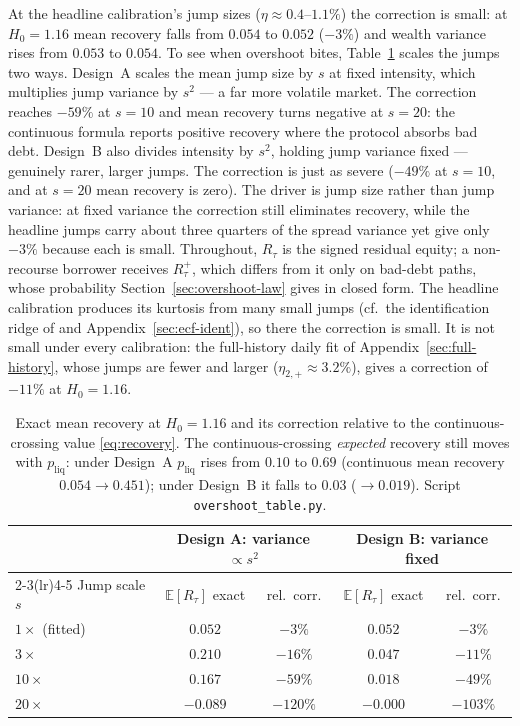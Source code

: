 \documentclass[11pt]{article}
\newcommand{\E}{\mathbb{E}}
\theoremstyle{plain}
\theoremstyle{definition}
\theoremstyle{remark}
\begin{document}
At the headline calibration's jump sizes ($\eta\approx0.4$--$1.1\%$) the correction is small: at $H_0=1.16$ mean
recovery falls from $0.054$ to $0.052$ ($-3\%$) and wealth variance rises from $0.053$ to $0.054$.
To see when overshoot bites, Table~\ref{tab:overshoot} scales the jumps two ways. Design~A scales
the mean jump size by $s$ at fixed intensity, which multiplies jump variance by $s^2$ --- a far more
volatile market. The correction reaches $-59\%$ at $s=10$ and mean recovery turns negative at
$s=20$: the continuous formula reports positive recovery where the protocol absorbs bad debt. Design~B
also divides intensity by $s^2$, holding jump variance fixed --- genuinely rarer, larger jumps. The
correction is just as severe ($-49\%$ at $s=10$, and at $s=20$ mean recovery is zero). The driver is
jump size rather than jump variance: at fixed variance the correction still eliminates recovery,
while the headline jumps carry about three quarters of the spread variance yet give only $-3\%$
because each is small.
Throughout, $R_\tau$ is the signed residual equity; a non-recourse borrower receives $R_\tau^+$,
which differs from it only on bad-debt paths, whose probability Section~\ref{sec:overshoot-law}
gives in closed form. The headline
calibration produces its kurtosis from many small jumps (cf.\ the identification ridge of
\citealt{RamezaniZeng2007} and Appendix~\ref{sec:ecf-ident}), so there the correction is small. It is
not small under every calibration: the full-history daily fit of Appendix~\ref{sec:full-history},
whose jumps are fewer and larger ($\eta_{2,+}\approx3.2\%$), gives a correction of $-11\%$ at
$H_0=1.16$.

\begin{table}[ht]
\centering
\small
\begin{tabular}{lcccc}
\toprule
 & \multicolumn{2}{c}{Design A: variance $\propto s^2$} & \multicolumn{2}{c}{Design B: variance fixed} \\
\cmidrule(lr){2-3}\cmidrule(lr){4-5}
Jump scale $s$ & $\E[R_\tau]$ exact & rel.\ corr. & $\E[R_\tau]$ exact & rel.\ corr. \\
\midrule
$1\times$ (fitted)  & $0.052$ & $-3\%$  & $0.052$ & $-3\%$ \\
$3\times$           & $0.210$ & $-16\%$ & $0.047$ & $-11\%$ \\
$10\times$          & $0.167$ & $-59\%$ & $0.018$ & $-49\%$ \\
$20\times$          & $-0.089$ & $-120\%$ & $-0.000$ & $-103\%$ \\
\bottomrule
\end{tabular}
\caption{Exact mean recovery at $H_0=1.16$ and its correction relative to the continuous-crossing
value \eqref{eq:recovery}. The continuous-crossing \emph{expected} recovery still moves with
$p_{\mathrm{liq}}$: under Design~A $p_{\mathrm{liq}}$ rises from $0.10$ to $0.69$ (continuous mean
recovery $0.054\to0.451$); under Design~B it falls to $0.03$ ($\to0.019$). Script
\texttt{overshoot\_table.py}.}
\label{tab:overshoot}
\end{table}
\end{document}
